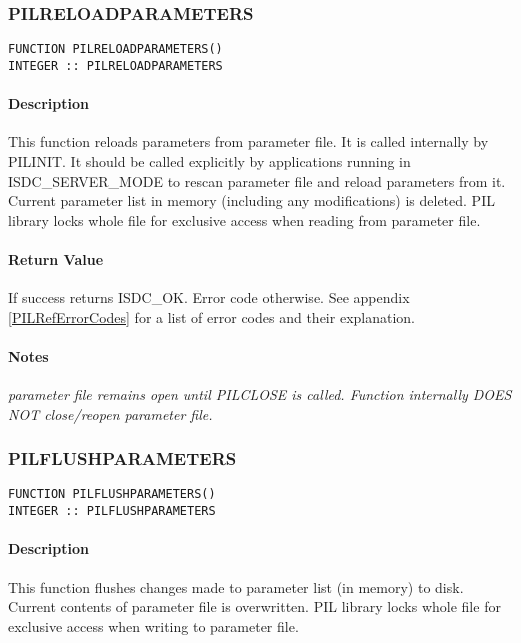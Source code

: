 
\subsubsection{PILRELOADPARAMETERS}

\begin{verbatim}
FUNCTION PILRELOADPARAMETERS() 
INTEGER :: PILRELOADPARAMETERS 
\end{verbatim}

\paragraph{Description\\}
This function reloads parameters from parameter file. It is called
internally by PILINIT. It should be called
explicitly by applications running in ISDC\_SERVER\_MODE to rescan parameter
file and reload parameters from
it. Current parameter list in memory (including any modifications) is
deleted. PIL library locks whole file for
exclusive access when reading from parameter file. 

\paragraph{Return Value\\}
If success returns ISDC\_OK. Error code otherwise. See appendix \ref{PILRefErrorCodes}
for a list of error codes and their explanation.

\paragraph{Notes\\}
{\it
parameter file remains open until PILCLOSE is called. Function internally
DOES NOT close/reopen parameter file. 
}


\subsubsection{PILFLUSHPARAMETERS}

\begin{verbatim}
FUNCTION PILFLUSHPARAMETERS() 
INTEGER :: PILFLUSHPARAMETERS 
\end{verbatim}

\paragraph{Description\\}
This function flushes changes made to parameter list (in memory) to disk.
Current contents of parameter file is
overwritten. PIL library locks whole file for exclusive access when writing
to parameter file. 

